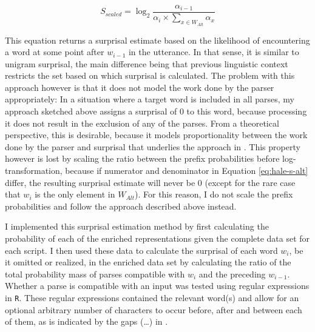 \begin{equation}
\displaystyle S_{scaled} = \log_2 \frac{\alpha_{i-1}}{\alpha_i \times \sum_{x\in W_{Alt}}{\alpha_x}} \label{eq:hale-s-alt}
\end{equation}

\largerpage
This equation returns a surprisal estimate based on the likelihood of encountering a word at some point after $w_{i-1}$ in the utterance. In that sense, it is similar to unigram surprisal, the main difference being that previous linguistic context restricts the set based on which surprisal is calculated. The problem with this approach however is that it does not model the work done by the parser appropriately: In a situation where a target word is included in all parses, my approach sketched above assigns a surprisal of 0 to this word, because processing it does not result in the exclusion of any of the parses. From a theoretical perspective, this is desirable, because it models proportionality between the work done by the parser and surprisal that underlies the approach in \citet{hale2001}. This property however is lost by scaling the ratio between the prefix probabilities before log-transformation, because if numerator and denominator in Equation \ref{eq:hale-s-alt} differ, the resulting surprisal estimate will never be 0 (except for the rare case that $w_i$ is the only element in $W_{Alt}$). For this reason, I do not scale the prefix probabilities and follow the approach described above instead.

\noindent I implemented this surprisal estimation method by first calculating the probability of each of the enriched representations given the complete data set for each script. I then used these data to calculate the surprisal of each word $w_i$, be it omitted or realized, in the enriched data set by calculating the ratio of the total probability mass of parses compatible with $w_i$ and the preceding $w_{i-1}$. Whether a parse is compatible with an input was tested using regular expressions in \texttt{R}. These regular expressions contained the relevant word(s) and allow for an optional arbitrary number of characters to occur before, after and between each of them, as is indicated by the gaps (\dots) in \Next. %

